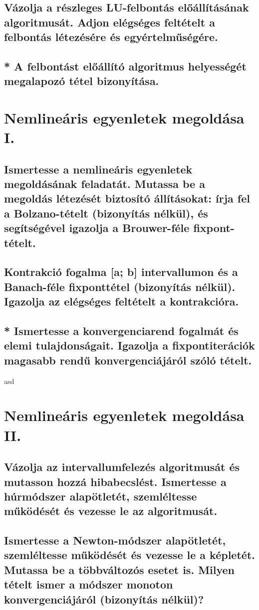 \documentclass{article}
\begin{document}
        \subsection{Vázolja a részleges LU-felbontás előállításának algoritmusát. Adjon elégséges feltételt a felbontás létezésére és egyértelműségére.}
        \subsection{* A felbontást előállító algoritmus helyességét megalapozó tétel bizonyítása.}


    \section{Nemlineáris egyenletek megoldása I.}
        \subsection{Ismertesse a nemlineáris egyenletek megoldásának feladatát. Mutassa be a megoldás létezését biztosító állításokat: írja fel a Bolzano-tételt (bizonyítás nélkül), és segítségével igazolja a Brouwer-féle fixpont-tételt.}
        \subsection{Kontrakció fogalma [a; b] intervallumon és a Banach-féle fixponttétel (bizonyítás nélkül). Igazolja az elégséges feltételt a kontrakcióra.}
        \subsection{* Ismertesse a konvergenciarend fogalmát és elemi tulajdonságait. Igazolja a fixpontiterációk magasabb rendű konvergenciájáról szóló tételt.}

asd
    \section{Nemlineáris egyenletek megoldása II.}
        \subsection{Vázolja az intervallumfelezés algoritmusát és mutasson hozzá hibabecslést. Ismertesse a húrmódszer alapötletét, szemléltesse működését és vezesse le az algoritmusát.}
        \subsection{Ismertesse a Newton-módszer alapötletét, szemléltesse működését és vezesse le a képletét. Mutassa be a többváltozós esetet is. Milyen tételt ismer a módszer monoton konvergenciájáról (bizonyítás nélkül)?}
\end{document}
